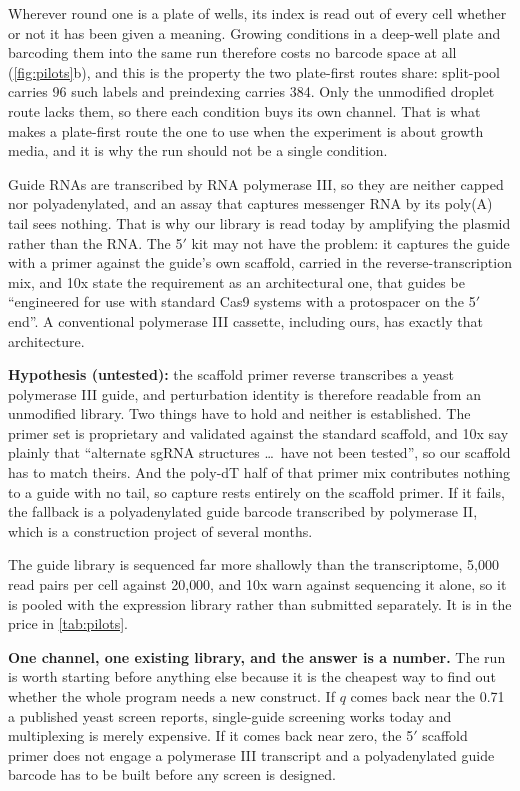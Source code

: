 Wherever round one is a plate of wells, its index is read out of every cell
whether or not it has been given a meaning. Growing conditions in a deep-well
plate and barcoding them into the same run therefore costs no barcode space at
all (\cref{fig:pilots}b), and this is the property the two plate-first routes
share: split-pool carries 96 such labels and preindexing carries 384. Only the
unmodified droplet route lacks them, so there each condition buys its own
channel. That is what makes a plate-first route the one to use when the
experiment is about growth media, and it is why the  run
should not be a single condition.

\label{sec:guide}
Guide RNAs are transcribed by RNA polymerase III, so they are neither capped nor
polyadenylated, and an assay that captures messenger RNA by its poly(A) tail
sees nothing. That is why our library is read today by amplifying the plasmid
rather than the RNA. The 5$'$ kit may not have the problem: it captures the
guide with a primer against the guide's own scaffold, carried in the
reverse-transcription mix, and 10x state the requirement as an architectural one,
that guides be ``engineered for use with standard Cas9 systems with a
protospacer on the 5$'$ end''. A conventional polymerase
III cassette, including ours, has exactly that architecture.

\textbf{Hypothesis (untested):} the scaffold primer reverse transcribes a yeast
polymerase III guide, and perturbation identity is therefore readable from an
unmodified library. Two things have to hold and neither is established. The
primer set is proprietary and validated against the standard 
scaffold, and 10x say plainly that ``alternate sgRNA structures \dots\ have not
been tested'', so our scaffold has to match theirs. And
the poly-dT half of that primer mix contributes nothing to a guide with no tail,
so capture rests entirely on the scaffold primer. If it fails, the fallback is a
polyadenylated guide barcode transcribed by polymerase II, which is a
construction project of several months.

The guide library is sequenced far more shallowly than the transcriptome, 5{,}000
read pairs per cell against 20{,}000, and 10x warn against sequencing it
alone, so it is pooled with the expression library rather
than submitted separately. It is in the price in \cref{tab:pilots}.

\begin{keybox}
\textbf{One channel, one existing library, and the answer is a number.} The
 run is worth starting before anything else because it is
the cheapest way to find out whether the whole program needs a new construct.
If $q$ comes back near the 0.71 a published yeast screen reports, single-guide
screening works today and multiplexing is merely expensive. If it comes back
near zero, the 5$'$ scaffold primer does not engage a polymerase III transcript
and a polyadenylated guide barcode has to be built before any screen is
designed.
\end{keybox}
